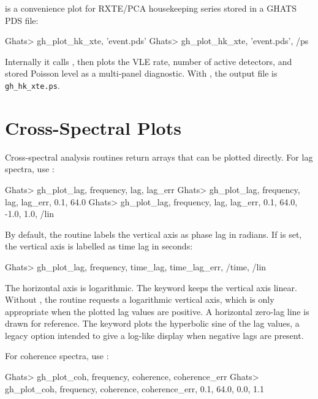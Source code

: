 is a convenience plot for RXTE/PCA housekeeping
series stored in a GHATS PDS file:

\begin{ghatsconsole}
Ghats> gh_plot_hk_xte, 'event.pds'
Ghats> gh_plot_hk_xte, 'event.pds', /ps
\end{ghatsconsole}

Internally it calls , then plots the VLE rate, number of
active detectors, and stored Poisson level as a multi-panel diagnostic.  With
, the output file is \texttt{gh\_hk\_xte.ps}.

\section{Cross-Spectral Plots}

Cross-spectral analysis routines return arrays that can be plotted directly.
For lag spectra, use :

\begin{ghatsconsole}
Ghats> gh_plot_lag, frequency, lag, lag_err
Ghats> gh_plot_lag, frequency, lag, lag_err, 0.1, 64.0
Ghats> gh_plot_lag, frequency, lag, lag_err, 0.1, 64.0, -1.0, 1.0, /lin
\end{ghatsconsole}

By default, the routine labels the vertical axis as phase lag in radians.  If
 is set, the vertical axis is labelled as time lag in seconds:

\begin{ghatsconsole}
Ghats> gh_plot_lag, frequency, time_lag, time_lag_err, /time, /lin
\end{ghatsconsole}

The horizontal axis is logarithmic.  The keyword  keeps the
vertical axis linear.  Without , the routine requests a
logarithmic vertical axis, which is only appropriate when the plotted lag
values are positive.  A horizontal zero-lag line is drawn for reference.  The
 keyword plots the hyperbolic sine of the lag values, a legacy
option intended to give a log-like display when negative lags are present.

For coherence spectra, use :

\begin{ghatsconsole}
Ghats> gh_plot_coh, frequency, coherence, coherence_err
Ghats> gh_plot_coh, frequency, coherence, coherence_err, 0.1, 64.0, 0.0, 1.1
\end{ghatsconsole}

